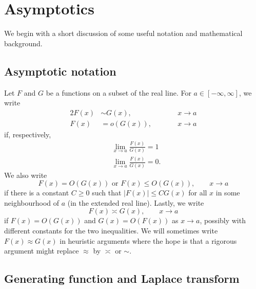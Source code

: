 
\section{Asymptotics}
\label{sec:asymp}

We begin with a short discussion of some useful notation and mathematical background.


\subsection{Asymptotic notation}

Let $F$ and $G$ be a functions on a subset of the real line.
For $a\in[-\infty,\infty]$, we write
\begin{alignat}{2}
F(x) &\sim G(x), &&\qquad x \to a \\
F(x) &= o(G(x)), &&\qquad x \to a
\end{alignat}
if, respectively,
\begin{align}
&\lim_{x\to a} \frac{F(x)}{G(x)} = 1 \\
&\lim_{x\to a} \frac{F(x)}{G(x)} = 0.
\end{align}
We also write
\begin{equation}
F(x) = O(G(x))
	\text{ or }
F(x) \le O(G(x)),
	\qquad
x \to a
\end{equation}
if there is a constant $C \ge 0$ such that $|F(x)| \le C G(x)$ for all
$x$ in some neighbourhood of $a$ (in the extended real line). Lastly, we write
\begin{equation}
F(x) \asymp G(x),
	\qquad
x \to a
\end{equation}
if $F(x) = O(G(x))$ and $G(x) = O(F(x))$ as $x\to a$, possibly with
different constants for the two inequalities. We will sometimes write
$F(x) \approx G(x)$ in heuristic
arguments where the hope is that a rigorous argument might replace $\approx$
by $\asymp$ or $\sim$.


\subsection{Generating function and Laplace transform}

